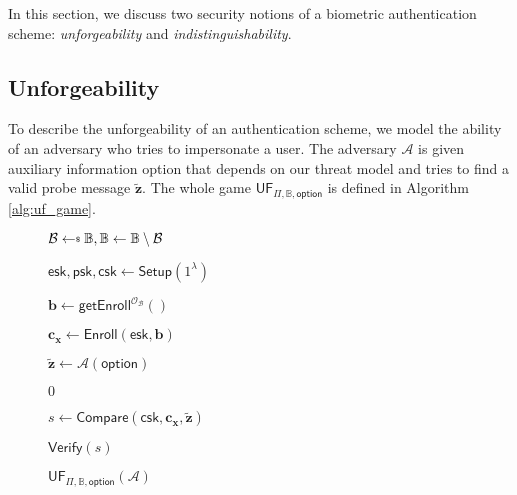 


In this section, we discuss two security notions of a biometric authentication scheme: \emph{unforgeability} and \emph{indistinguishability}.

\subsection{Unforgeability}
\label{sec:uf_game}

To describe the unforgeability of an authentication scheme, we model the ability of an adversary who tries to impersonate a user. The adversary $\mathcal{A}$ is given auxiliary information \textsf{option} that depends on our threat model and tries to find a valid probe message $\mathbf{\tilde{z}}$. The whole game $\textsf{UF}_{\Pi, \mathbb{B}, \textsf{option}}$ is defined in Algorithm \ref{alg:uf_game}.

\begin{figure}[h]
\centering
	\begin{minipage}[t]{0.6\linewidth}
	\centering
	\begin{algorithm}[H]
	\caption{$\textsf{UF}_{\Pi, \mathbb{B}, \textsf{option}}(\mathcal{A})$}
	\label{alg:uf_game}
	\begin{algorithmic}[1]
		\State $\mathcal{B} \getsdollar \mathbb{B}, \mathbb{B} \gets \mathbb{B} \setminus \mathcal{B}$

		\State $\textsf{esk}, \textsf{psk}, \textsf{csk} \gets \textsf{Setup}(1^\lambda)$
		
		\State $\mathbf{b} \gets \textsf{getEnroll}^{\mathcal{O}_{\mathcal{B}}}()$

		\State $\mathbf{c_x} \gets \textsf{Enroll}(\textsf{esk}, \mathbf{b})$
		
		\State ${\mathbf{\tilde{z}}} \gets \mathcal{A} ( \textsf{option} )$
 
			
			\State \Return $0$
		
		\EndIf

		\State $s \gets \textsf{Compare}( \textsf{csk}, \mathbf{c_x}, \mathbf{\tilde{z}} )$

		\State \Return $\textsf{Verify}(s)$
	\end{algorithmic}
	\end{algorithm}
	\end{minipage}
	
\label{fig:uf_game}
\end{figure}

